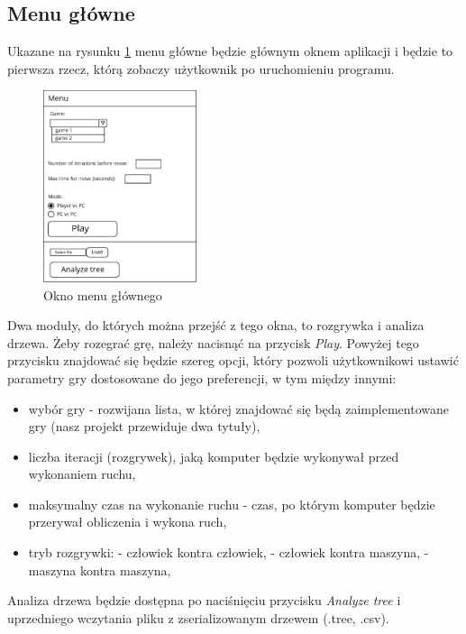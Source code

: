 \documentclass{article}
\begin{document}
	\subsection{Menu główne}
	Ukazane na rysunku \ref{rys:main_menu} menu główne będzie głównym oknem aplikacji i będzie to pierwsza rzecz, którą zobaczy użytkownik po uruchomieniu programu.
	\begin{figure}[h!]
		\centering
		\includegraphics[width=0.4\textwidth]{menu-eps}
		\caption{Okno menu głównego}
		\label{rys:main_menu}
	\end{figure}

	\noindent Dwa moduły, do których można przejść z tego okna, to rozgrywka i analiza drzewa.	Żeby rozegrać grę, należy nacisnąć na przycisk \textit{Play}. Powyżej tego przycisku znajdować się będzie szereg opcji, który pozwoli użytkownikowi ustawić parametry gry dostosowane do jego preferencji, w tym między innymi:\\
	
	\begin{itemize}
		\item wybór gry - rozwijana lista, w której znajdować się będą zaimplementowane gry (nasz projekt przewiduje dwa tytuły),
		\item liczba iteracji (rozgrywek), jaką komputer będzie wykonywał przed wykonaniem ruchu,
		\item maksymalny czas na wykonanie ruchu - czas, po którym komputer będzie przerywał obliczenia i wykona ruch,
		\item tryb rozgrywki:
		\subitem - człowiek kontra człowiek,
		\subitem - człowiek kontra maszyna,
		\subitem - maszyna kontra maszyna,\\
	\end{itemize}

	\noindent Analiza drzewa będzie dostępna po naciśnięciu przycisku \textit{Analyze tree} i uprzedniego wczytania pliku z zserializowanym drzewem (.tree, .csv).
	
\end{document}
